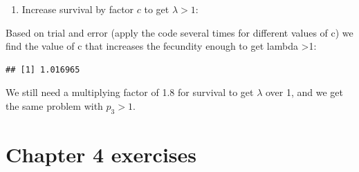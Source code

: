 \documentclass[
]{book}
\newenvironment{Shaded}{\begin{snugshade}}{\end{snugshade}}
\newcommand{\AttributeTok}[1]{\textcolor[rgb]{0.77,0.63,0.00}{#1}}
\newcommand{\CommentTok}[1]{\textcolor[rgb]{0.56,0.35,0.01}{\textit{#1}}}
\newcommand{\DecValTok}[1]{\textcolor[rgb]{0.00,0.00,0.81}{#1}}
\newcommand{\FloatTok}[1]{\textcolor[rgb]{0.00,0.00,0.81}{#1}}
\newcommand{\FunctionTok}[1]{\textcolor[rgb]{0.00,0.00,0.00}{#1}}
\newcommand{\NormalTok}[1]{#1}
\newcommand{\OtherTok}[1]{\textcolor[rgb]{0.56,0.35,0.01}{#1}}
\newcommand{\SpecialCharTok}[1]{\textcolor[rgb]{0.00,0.00,0.00}{#1}}
\providecommand{\tightlist}{%
  \setlength{\itemsep}{0pt}\setlength{\parskip}{0pt}}
\begin{document}
\begin{enumerate}
\def\labelenumi{\arabic{enumi}.}
\setcounter{enumi}{7}
\tightlist
\item
  Increase survival by factor \(c\) to get \(\lambda>1\):
\end{enumerate}

Based on trial and error (apply the code several times for different values of c) we find the value of c that increases the fecundity enough to get lambda \textgreater1:

\begin{Shaded}
\end{Shaded}

\begin{verbatim}
## [1] 1.016965
\end{verbatim}

We still need a multiplying factor of 1.8 for survival to get \(\lambda\) over 1, and we get the same problem with \(p_3>1\).

\hypertarget{chapter-4-exercises}{%
\section{Chapter 4 exercises}\label{chapter-4-exercises}}
\end{document}
